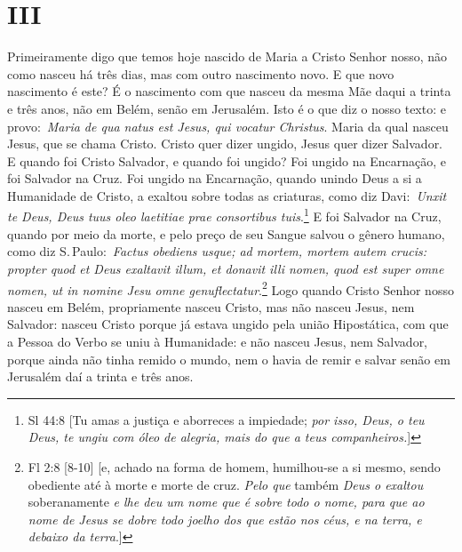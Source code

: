 \section*{III}

Primeiramente digo que temos hoje nascido de Maria a Cristo
Senhor nosso, não como nasceu há três dias, mas com outro nascimento
novo. E que novo nascimento é este? É o nascimento com que nasceu da
mesma Mãe daqui a trinta e três anos, não em Belém, senão em Jerusalém.
Isto é o que diz o nosso texto: e provo:~\emph{Maria de qua natus est
Jesus, qui vocatur Christus}. Maria da qual nasceu Jesus, que se chama
Cristo. Cristo quer dizer ungido, Jesus quer dizer Salvador. E quando
foi Cristo Salvador, e quando foi ungido? Foi ungido na Encarnação, e
foi Salvador na Cruz. Foi ungido na Encarnação, quando unindo Deus a si
a Humanidade de Cristo, a exaltou sobre todas as criaturas, como diz
Davi:~\emph{Unxit te Deus, Deus tuus oleo laetitiae prae consortibus
tuis}.\footnote{Sl 44:8 [Tu amas a justiça e aborreces a impiedade; \textit{por isso, Deus, o teu Deus, te ungiu com óleo de alegria, mais do que a teus companheiros.}]} E foi Salvador na Cruz, quando por meio da
morte, e pelo preço de seu Sangue salvou o gênero humano, como diz S.\,Paulo:~\emph{Factus obediens usque; ad mortem, mortem autem crucis:
propter quod et Deus exaltavit illum, et donavit illi nomen, quod est
super omne nomen, ut in nomine Jesu omne
genuflectatur}.\footnote{Fl 2:8 [8-10] [e, achado na forma de homem, humilhou-se a si mesmo, sendo obediente até à morte e morte de cruz. \textit{Pelo que} também \textit{Deus o exaltou} soberanamente \textit{e lhe deu um nome que é sobre todo o nome, para que ao nome de Jesus se dobre todo joelho dos que estão nos céus, e na terra, e debaixo da terra}.]} Logo quando Cristo Senhor nosso nasceu
em Belém, propriamente nasceu Cristo, mas não nasceu Jesus, nem
Salvador: nasceu Cristo porque já estava ungido pela união Hipostática,
com que a Pessoa do Verbo se uniu à Humanidade: e não nasceu Jesus, nem
Salvador, porque ainda não tinha remido o mundo, nem o havia de remir e
salvar senão em Jerusalém daí a trinta e três anos.


